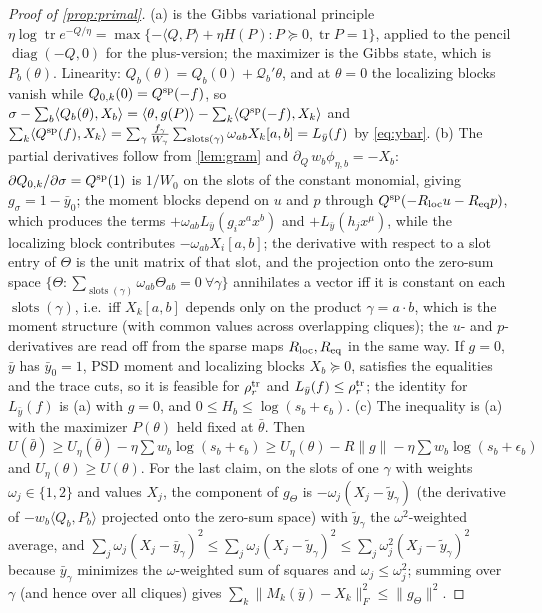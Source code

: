 \documentclass[a4paper,11pt]{article}
\theoremstyle{plain}
\theoremstyle{definition}
\theoremstyle{remark}
\newcommand{\diag}{\operatorname{diag}}
\newcommand{\tr}{\operatorname{tr}}
\newcommand{\iprod}[2]{\langle #1,#2\rangle}
\begin{document}
\begin{proof}[Proof of \cref{prop:primal}]
(a) is the Gibbs variational principle $\eta\log\tr e^{-Q/\eta}=\max\{-\iprod{Q}{P}+\eta H(P):P\succeq0,\tr P=1\}$, applied to the pencil $\diag(-Q,0)$ for the plus-version; the maximizer is the Gibbs state, which is $P_b(\theta)$. Linearity: $Q_b(\theta)=Q_b(0)+\mathcal Q_b'\theta$, and at $\theta=0$ the localizing blocks vanish while $Q_{0,k}(0)=Q^{\rm sp}(-f)$, so $\sigma-\sum_b\iprod{Q_b(\theta)}{X_b}=\iprod{\theta}{g(P)}-\sum_k\iprod{Q^{\rm sp}(-f)}{X_k}$ and $\sum_k\iprod{Q^{\rm sp}(f)}{X_k}=\sum_\gamma\frac{f_\gamma}{W_\gamma}\sum_{\operatorname{slots}(\gamma)}\omega_{ab}X_k[a,b]=L_{\bar y}(f)$ by \eqref{eq:ybar}.
(b) The partial derivatives follow from \cref{lem:gram} and $\partial_Q\,w_b\phi_{\eta,b}=-X_b$: $\partial Q_{0,k}/\partial\sigma=Q^{\rm sp}(1)$ is $1/W_0$ on the slots of the constant monomial, giving $g_\sigma=1-\bar y_0$; the moment blocks depend on $u$ and $p$ through $Q^{\rm sp}(-R_{\rm loc}u-R_{\rm eq}p)$, which produces the terms $+\omega_{ab}L_{\bar y}(g_ix^ax^b)$ and $+L_{\bar y}(h_jx^\mu)$, while the localizing block contributes $-\omega_{ab}X_i[a,b]$; the derivative with respect to a slot entry of $\Theta$ is the unit matrix of that slot, and the projection onto the zero-sum space $\{\Theta:\sum_{\operatorname{slots}(\gamma)}\omega_{ab}\Theta_{ab}=0\ \forall\gamma\}$ annihilates a vector iff it is constant on each $\operatorname{slots}(\gamma)$, i.e.\ iff $X_k[a,b]$ depends only on the product $\gamma=a\cdot b$, which is the moment structure (with common values across overlapping cliques); the $u$- and $p$-derivatives are read off from the sparse maps $R_{\rm loc},R_{\rm eq}$ in the same way. If $g=0$, $\bar y$ has $\bar y_0=1$, PSD moment and localizing blocks $X_b\succeq0$, satisfies the equalities and the trace cuts, so it is feasible for $\rho_r^{\rm tr}$ and $L_{\bar y}(f)\le\rho_r^{\rm tr}$; the identity for $L_{\bar y}(f)$ is (a) with $g=0$, and $0\le H_b\le\log(s_b+\epsilon_b)$.
(c) The inequality is (a) with the maximizer $P(\theta)$ held fixed at $\bar\theta$. Then $U(\bar\theta)\ge U_\eta(\bar\theta)-\eta\sum w_b\log(s_b+\epsilon_b)\ge U_\eta(\theta)-R\|g\|-\eta\sum w_b\log(s_b+\epsilon_b)$ and $U_\eta(\theta)\ge U(\theta)$. For the last claim, on the slots of one $\gamma$ with weights $\omega_j\in\{1,2\}$ and values $X_j$, the component of $g_\Theta$ is $-\omega_j(X_j-\tilde y_\gamma)$ (the derivative of $-w_b\iprod{Q_b}{P_b}$ projected onto the zero-sum space) with $\tilde y_\gamma$ the $\omega^2$-weighted average, and $\sum_j\omega_j(X_j-\bar y_\gamma)^2\le\sum_j\omega_j(X_j-\tilde y_\gamma)^2\le\sum_j\omega_j^2(X_j-\tilde y_\gamma)^2$ because $\bar y_\gamma$ minimizes the $\omega$-weighted sum of squares and $\omega_j\le\omega_j^2$; summing over $\gamma$ (and hence over all cliques) gives $\sum_k\|M_k(\bar y)-X_k\|_F^2\le\|g_\Theta\|^2$.

\end{proof}
\end{document}
